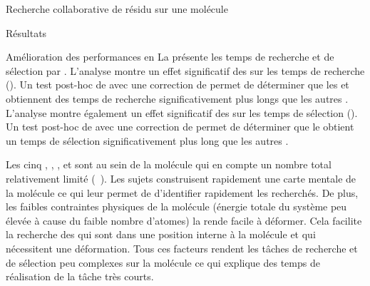 \documentclass[myfrancais]{mythesis}
\begin{document}
\begin{mychapter}{Recherche collaborative de résidu sur une molécule}
\begin{mysection}{Résultats}
\begin{mysubsection}{Amélioration des performances en }
				La  présente les temps de recherche et de sélection par  .
				L'analyse montre un effet significatif des   sur les temps de recherche ().
				Un test post-hoc de  avec une correction de  permet de déterminer que les   et  obtiennent des temps de recherche significativement plus longs que les autres .
				L'analyse montre également un effet significatif des   sur les temps de sélection ().
				Un test post-hoc de  avec une correction de  permet de déterminer que le   obtient un temps de sélection significativement plus long que les autres .

				Les cinq  , , ,  et  sont au sein de la molécule \myTRPCAGE qui en compte un nombre total relativement limité (~).
				Les sujets construisent rapidement une carte mentale de la molécule ce qui leur permet de d'identifier rapidement les  recherchés.
				De plus, les faibles contraintes physiques de la molécule (énergie totale du système peu élevée à cause du faible nombre d'atomes) la rende facile à déformer.
				Cela facilite la recherche des  qui sont dans une position interne à la molécule et qui nécessitent une déformation.
				Tous ces facteurs rendent les tâches de recherche et de sélection peu complexes sur la molécule \myTRPCAGE ce qui explique des temps de réalisation de la tâche très courts.


\end{mysubsection}
\end{mysection}
\end{mychapter}
\end{document}
